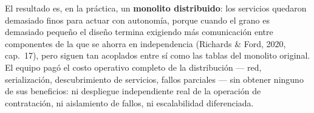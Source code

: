 El resultado es, en la práctica, un \textbf{monolito distribuido}: los servicios
quedaron demasiado finos para actuar con autonomía, porque cuando el grano es
demasiado pequeño el diseño termina exigiendo más comunicación entre componentes
de la que se ahorra en independencia (Richards \& Ford, 2020, cap.~17), pero siguen
tan acoplados entre sí como las tablas del monolito original. El equipo pagó el
costo operativo completo de la distribución --- red, serialización, descubrimiento
de servicios, fallos parciales --- sin obtener ninguno de sus beneficios: ni
despliegue independiente real de la operación de contratación, ni aislamiento de
fallos, ni escalabilidad diferenciada.

